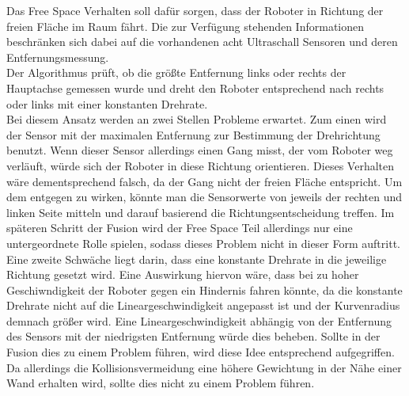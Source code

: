 \documentclass[12pt, a4paper]{report}
\begin{document}
Das Free Space Verhalten soll dafür sorgen, dass der Roboter in Richtung der freien Fläche im Raum fährt. Die zur Verfügung stehenden Informationen beschränken sich dabei auf die vorhandenen acht Ultraschall Sensoren und deren Entfernungsmessung.
\\
Der Algorithmus prüft, ob die größte Entfernung links oder rechts der Hauptachse gemessen wurde und dreht den Roboter entsprechend nach rechts oder links mit einer konstanten Drehrate. 
\\
Bei diesem Ansatz werden an zwei Stellen Probleme erwartet. Zum einen wird der Sensor mit der maximalen Entfernung zur Bestimmung der Drehrichtung benutzt. Wenn dieser Sensor allerdings einen Gang misst, der vom Roboter weg verläuft, würde sich der Roboter in diese Richtung orientieren. Dieses Verhalten wäre dementsprechend falsch, da der Gang nicht der freien Fläche entspricht. Um dem entgegen zu wirken, könnte man die Sensorwerte von jeweils der rechten und linken Seite mitteln und darauf basierend die Richtungsentscheidung treffen. Im späteren Schritt der Fusion wird der Free Space Teil allerdings nur eine untergeordnete Rolle spielen, sodass dieses Problem nicht in dieser Form auftritt.\\
Eine zweite Schwäche liegt darin, dass eine konstante Drehrate in die jeweilige Richtung gesetzt wird. Eine Auswirkung hiervon wäre, dass bei zu hoher Geschiwndigkeit der Roboter gegen ein Hindernis fahren könnte, da die konstante Drehrate nicht auf die Lineargeschwindigkeit angepasst ist und der Kurvenradius demnach größer wird. Eine Lineargeschwindigkeit abhängig von der Entfernung des Sensors mit der niedrigsten Entfernung würde dies beheben. Sollte in der Fusion dies zu einem Problem führen, wird diese Idee entsprechend aufgegriffen. Da allerdings die Kollisionsvermeidung eine höhere Gewichtung in der Nähe einer Wand erhalten wird, sollte dies nicht zu einem Problem führen.
\end{document}
